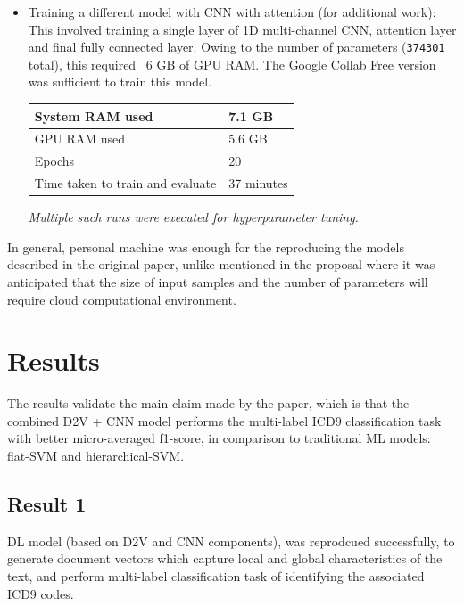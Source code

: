 \documentclass[11pt,a4paper]{article}
\begin{document}
\begin{itemize}
	\item Training a different model with CNN with attention (for additional work): This involved training a single layer of 1D multi-channel CNN, attention layer and final fully connected layer. Owing to the number of parameters (\texttt{374301} total), this required ~6 GB of GPU RAM. The Google Collab Free version was sufficient to train this model.
\newline

\begin{small}
\begin{tabular}{ ll }
	\hline
   		System RAM used & 7.1 GB \\
  	\hline
    		GPU RAM used & 5.6 GB \\
  	\hline
  		Epochs & 20 \\
  	\hline
  		Time taken to train and evaluate & 37 minutes \\
  	\hline
\end{tabular}
\end{small}
\newline	
\textit{Multiple such runs were executed for hyperparameter tuning.}	
\end{itemize}


In general, personal machine was enough for the reproducing the models described in the original paper, unlike mentioned in the proposal where it was anticipated that the size of input samples and the number of parameters will require cloud computational environment.

\section{Results}

The results validate the main claim made by the paper, which is that the combined D2V + CNN model performs the multi-label ICD9 classification task with better micro-averaged f1-score, in comparison to traditional ML models: flat-SVM and hierarchical-SVM.

\subsection{Result 1}

DL model (based on D2V and CNN components), was reprodcued successfully, to generate document vectors which capture local and global characteristics of the text, and perform multi-label classification task of identifying the associated ICD9 codes.
\newline
\end{document}
